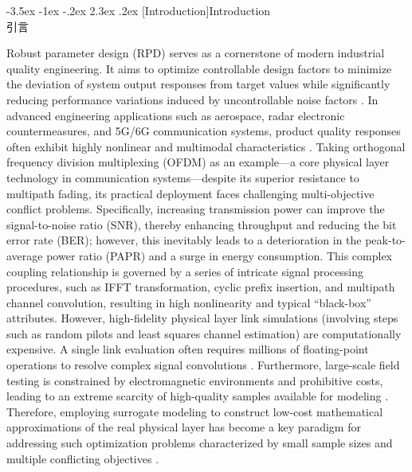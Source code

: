 \documentclass[11pt]{article}
\makeatletter
\renewcommand\section{\@startsection {section}{1}{\z@}%
                                       {-3.5ex \@plus -1ex \@minus -.2ex}%
                                       {2.3ex \@plus.2ex}%
                                       {\normalfont\fontfamily{phv}\fontsize{16}{19}\bfseries}}
\newcommand{\bisection}[2]{\section[#1]{#1\protect\\#2}}
\makeatother
\begin{document}


\bisection{Introduction}{引言} \label{s:intro}

Robust parameter design (RPD) serves as a cornerstone of modern industrial quality engineering. It aims to optimize controllable design factors to minimize the deviation of system output responses from target values while significantly reducing performance variations induced by uncontrollable noise factors \citep{Taguchi1986, Joseph2006, Montgomery2017, Hamada2021}. In advanced engineering applications such as aerospace, radar electronic countermeasures, and 5G/6G communication systems, product quality responses often exhibit highly nonlinear and multimodal characteristics \citep{Wang2020, Liu2025, Gnanasambandam2025, SongJ2025}. Taking orthogonal frequency division multiplexing (OFDM) as an example—a core physical layer technology in communication systems—despite its superior resistance to multipath fading, its practical deployment faces challenging multi-objective conflict problems. Specifically, increasing transmission power can improve the signal-to-noise ratio (SNR), thereby enhancing throughput and reducing the bit error rate (BER); however, this inevitably leads to a deterioration in the peak-to-average power ratio (PAPR) and a surge in energy consumption. This complex coupling relationship is governed by a series of intricate signal processing procedures, such as IFFT transformation, cyclic prefix insertion, and multipath channel convolution, resulting in high nonlinearity and typical “black-box” attributes. However, high-fidelity physical layer link simulations (involving steps such as random pilots and least squares channel estimation) are computationally expensive. A single link evaluation often requires millions of floating-point operations to resolve complex signal convolutions \citep{Song2025}. Furthermore, large-scale field testing is constrained by electromagnetic environments and prohibitive costs, leading to an extreme scarcity of high-quality samples available for modeling \citep{Ming2022, Sauer2022, Ghandwani2025}. Therefore, employing surrogate modeling to construct low-cost mathematical approximations of the real physical layer has become a key paradigm for addressing such optimization problems characterized by small sample sizes and multiple conflicting objectives \citep{Luo2022, LiY2025}.
\end{document}
